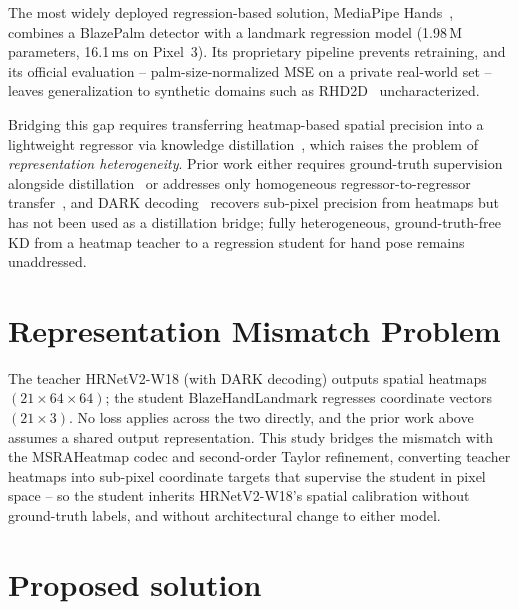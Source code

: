 \documentclass[11pt,conference,a4paper]{APSIPA2026}
\begin{document}
The most widely deployed regression-based solution, MediaPipe
Hands~\cite{mediapipe2020}, combines a BlazePalm detector with a
landmark regression model (1.98\,M parameters, 16.1\,ms on Pixel~3).
Its proprietary pipeline prevents retraining, and its official
evaluation -- palm-size-normalized MSE on a private real-world set
-- leaves generalization to synthetic domains such as
RHD2D~\cite{zimmermann2017learning} uncharacterized.

Bridging this gap requires transferring heatmap-based spatial
precision into a lightweight regressor via knowledge
distillation~\cite{hinton2015distilling}, which raises the problem of
\emph{representation heterogeneity}. Prior work either requires
ground-truth supervision alongside distillation~\cite{sun2018integral}
or addresses only homogeneous regressor-to-regressor
transfer~\cite{saputra2019}, and DARK decoding~\cite{zhang2020dark}
recovers sub-pixel precision from heatmaps but has not been used as a
distillation bridge; fully heterogeneous, ground-truth-free KD from a
heatmap teacher to a regression student for hand pose remains
unaddressed.


\section{Representation Mismatch Problem}
The teacher HRNetV2-W18 (with DARK decoding) outputs spatial heatmaps $(21 \times 64 \times 64)$; the student BlazeHandLandmark regresses coordinate vectors $(21 \times 3)$. No loss applies across the two directly, and the prior work above assumes a shared output representation. This study bridges the mismatch with the MSRAHeatmap codec and second-order Taylor refinement, converting teacher heatmaps into sub-pixel coordinate targets that supervise the student in pixel space -- so the student inherits HRNetV2-W18's spatial calibration without ground-truth labels, and without architectural change to either model.

\section{Proposed solution}
\label{sec:method}
\end{document}
